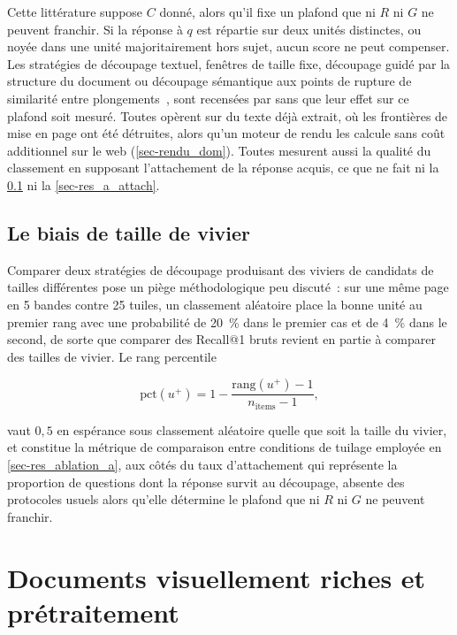 Cette littérature suppose $C$ donné, alors qu'il fixe un plafond que ni $R$ ni
$G$ ne peuvent franchir. Si la réponse à $q$ est répartie sur deux unités
distinctes, ou noyée dans une unité majoritairement hors sujet, aucun score ne
peut compenser. Les stratégies de découpage textuel, fenêtres de taille fixe, découpage guidé
par la structure du document ou découpage sémantique aux points de rupture de
similarité entre plongements~\citep{semchunk2025}, sont recensées par
\citet{ragsurvey2023} sans que leur effet sur ce plafond soit mesuré. Toutes
opèrent sur du texte déjà extrait, où les frontières de mise en page ont été
détruites, alors qu'un moteur de rendu les calcule sans coût additionnel sur le
web (\cref{sec-rendu_dom}). Toutes mesurent aussi la qualité du classement en
supposant l'attachement de la réponse acquis, ce que ne fait ni la
\cref{sec-eda_pool} ni la \cref{sec-res_a_attach}.

\subsection{Le biais de taille de vivier}
\label{sec-eda_pool}

Comparer deux stratégies de découpage produisant des viviers de candidats de
tailles différentes pose un piège méthodologique peu discuté~: sur une même
page en \num{5} bandes contre \num{25} tuiles, un classement aléatoire place
la bonne unité au premier rang avec une probabilité de \SI{20}{\percent} dans
le premier cas et de \SI{4}{\percent} dans le second, de sorte que comparer
des Recall@1 bruts revient en partie à comparer des tailles de vivier. Le rang
percentile

\begin{equation}
\mathrm{pct}(u^{+}) = 1 - \frac{\mathrm{rang}(u^{+}) - 1}{n_{\text{items}} - 1},
\label{eq-pctrank}
\end{equation}

vaut $0{,}5$ en espérance sous classement aléatoire quelle que soit la taille
du vivier, et constitue la métrique de comparaison entre conditions de
tuilage employée en \cref{sec-res_ablation_a}, aux côtés du taux
d'attachement qui représente la proportion de questions dont la réponse survit au
découpage, absente des protocoles usuels alors qu'elle détermine le plafond
que ni $R$ ni $G$ ne peuvent franchir.

\section{Documents visuellement riches et prétraitement}
\label{sec-eda_docvisuel}

